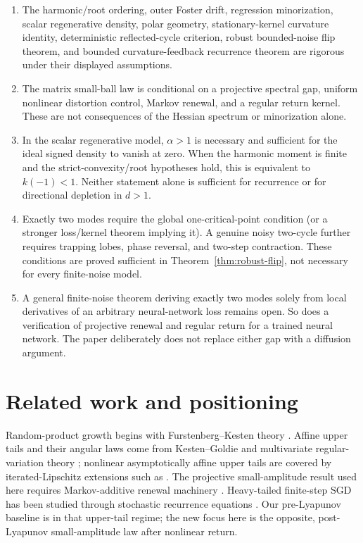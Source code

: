 \documentclass[10pt]{article}
\theoremstyle{definition}
\theoremstyle{remark}
\begin{document}
\begin{enumerate}
\item The harmonic/root ordering, outer Foster drift, regression
minorization, scalar regenerative density, polar geometry, stationary-kernel
curvature identity, deterministic reflected-cycle criterion, robust
bounded-noise flip theorem, and bounded curvature-feedback recurrence theorem
are rigorous under their displayed assumptions.
\item The matrix small-ball law is conditional on a projective spectral gap,
uniform nonlinear distortion control, Markov renewal, and a regular return
kernel.  These are not consequences of the Hessian spectrum or minorization
alone.
\item In the scalar regenerative model, $\alpha>1$ is necessary and
sufficient for the ideal signed density to vanish at zero.  When the harmonic
moment is finite and the strict-convexity/root hypotheses hold, this is
equivalent to $k(-1)<1$.  Neither statement alone is sufficient for recurrence
or for directional depletion in $d>1$.
\item Exactly two modes require the global one-critical-point condition (or a
stronger loss/kernel theorem implying it).  A genuine noisy two-cycle further
requires trapping lobes, phase reversal, and two-step contraction.  These
conditions are proved sufficient in Theorem~\ref{thm:robust-flip}, not
necessary for every finite-noise model.
\item A general finite-noise theorem deriving exactly two modes solely from
local derivatives of an arbitrary neural-network loss remains open.  So does
a verification of projective renewal and regular return for a trained neural
network.  The paper deliberately does not replace either gap with a diffusion
argument.
\end{enumerate}

\section{Related work and positioning}

Random-product growth begins with Furstenberg--Kesten theory
\cite{FurstenbergKesten1960}.  Affine upper tails and their angular laws come
from Kesten--Goldie and multivariate regular-variation theory
\cite{Kesten1973,Goldie1991,Buraczewski2016,GuivarchLePage2016}; nonlinear
asymptotically affine upper tails are covered by iterated-Lipschitz extensions
such as \cite{Mirek2011}.  The projective small-amplitude result used here
requires Markov-additive renewal machinery
\cite{Kesten1974,NeyNummelin1987a,NeyNummelin1987b,Alsmeyer1994}.  Heavy-tailed
finite-step SGD has been studied through stochastic recurrence equations
\cite{Gurbuzbalaban2021,Hodgkinson2021,DamekMentemeier2026}.  Our
pre-Lyapunov baseline is in that upper-tail regime; the new focus here is the
opposite, post-Lyapunov small-amplitude law after nonlinear return.
\end{document}
